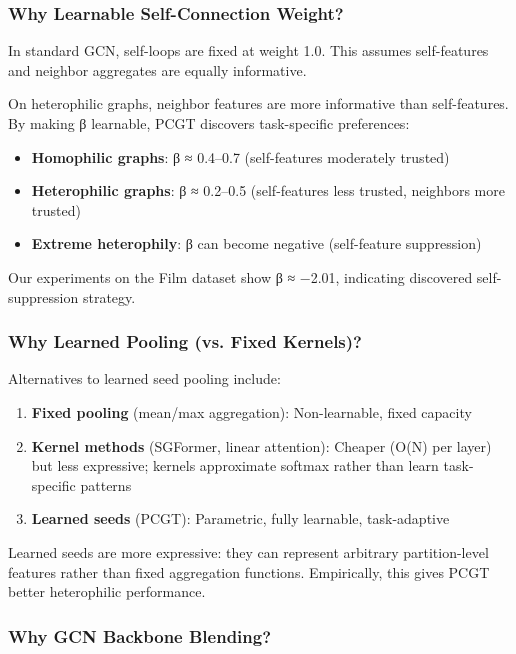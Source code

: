 \documentclass[11pt, a4paper]{article}
\begin{document}
\subsubsection{Why Learnable Self-Connection Weight?}

In standard GCN, self-loops are fixed at weight 1.0. This assumes self-features and neighbor aggregates are equally informative.

On heterophilic graphs, neighbor features are more informative than self-features. By making β learnable, PCGT discovers task-specific preferences:

\begin{itemize}
    \item \textbf{Homophilic graphs}: β ≈ 0.4–0.7 (self-features moderately trusted)
    \item \textbf{Heterophilic graphs}: β ≈ 0.2–0.5 (self-features less trusted, neighbors more trusted)
    \item \textbf{Extreme heterophily}: β can become negative (self-feature suppression)
\end{itemize}

Our experiments on the Film dataset show β ≈ −2.01, indicating discovered self-suppression strategy.

\subsubsection{Why Learned Pooling (vs. Fixed Kernels)?}

Alternatives to learned seed pooling include:

\begin{enumerate}
    \item \textbf{Fixed pooling} (mean/max aggregation): Non-learnable, fixed capacity
    \item \textbf{Kernel methods} (SGFormer, linear attention): Cheaper (O(N) per layer) but less expressive; kernels approximate softmax rather than learn task-specific patterns
    \item \textbf{Learned seeds} (PCGT): Parametric, fully learnable, task-adaptive
\end{enumerate}

Learned seeds are more expressive: they can represent arbitrary partition-level features rather than fixed aggregation functions. Empirically, this gives PCGT better heterophilic performance.

\subsubsection{Why GCN Backbone Blending?}
\end{document}
